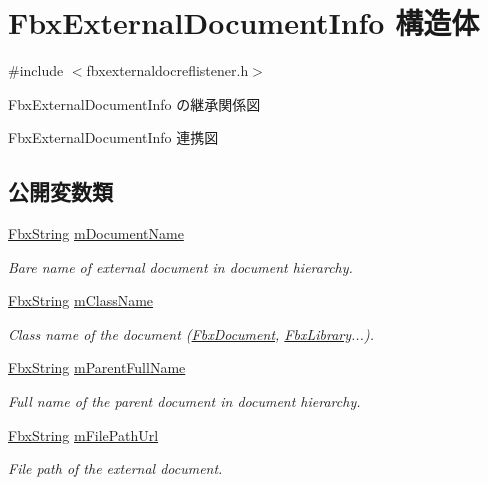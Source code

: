\hypertarget{struct_fbx_external_document_info}{}\section{Fbx\+External\+Document\+Info 構造体}
\label{struct_fbx_external_document_info}


{\ttfamily \#include $<$fbxexternaldocreflistener.\+h$>$}



Fbx\+External\+Document\+Info の継承関係図


Fbx\+External\+Document\+Info 連携図
\subsection*{公開変数類}
\begin{DoxyCompactItemize}
\item 
\hyperlink{class_fbx_string}{Fbx\+String} \hyperlink{struct_fbx_external_document_info_a3744e27dd1ba48aa66b36c7e896cde89}{m\+Document\+Name}
\begin{DoxyCompactList}\small\item\em Bare name of external document in document hierarchy. \end{DoxyCompactList}\item 
\hyperlink{class_fbx_string}{Fbx\+String} \hyperlink{struct_fbx_external_document_info_a0dcde2cfd81d268f174c54c7eed46b8b}{m\+Class\+Name}
\begin{DoxyCompactList}\small\item\em Class name of the document (\hyperlink{class_fbx_document}{Fbx\+Document}, \hyperlink{class_fbx_library}{Fbx\+Library}...). \end{DoxyCompactList}\item 
\hyperlink{class_fbx_string}{Fbx\+String} \hyperlink{struct_fbx_external_document_info_ae677004de679e0106dcfea163f36079c}{m\+Parent\+Full\+Name}
\begin{DoxyCompactList}\small\item\em Full name of the parent document in document hierarchy. \end{DoxyCompactList}\item 
\hyperlink{class_fbx_string}{Fbx\+String} \hyperlink{struct_fbx_external_document_info_a65b555c9b2dc44bc63d65b3ae2c24cac}{m\+File\+Path\+Url}
\begin{DoxyCompactList}\small\item\em File path of the external document. \end{DoxyCompactList}\end{DoxyCompactItemize}


